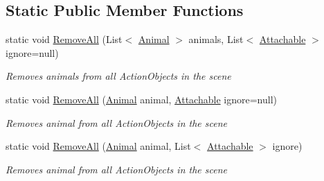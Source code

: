 \subsection*{Static Public Member Functions}
\begin{DoxyCompactItemize}
\item 
static void \mbox{\hyperlink{class_attachable_a63695e26ad1e6e27d3d252451524f18e}{Remove\+All}} (List$<$ \mbox{\hyperlink{class_animal}{Animal}} $>$ animals, List$<$ \mbox{\hyperlink{class_attachable}{Attachable}} $>$ ignore=null)
\begin{DoxyCompactList}\small\item\em Removes {\itshape animals}  from all Action\+Objects in the scene \end{DoxyCompactList}\item 
static void \mbox{\hyperlink{class_attachable_a2431a3ad3f6a1a2a4d697e6cc661d55c}{Remove\+All}} (\mbox{\hyperlink{class_animal}{Animal}} animal, \mbox{\hyperlink{class_attachable}{Attachable}} ignore=null)
\begin{DoxyCompactList}\small\item\em Removes {\itshape animal}  from all Action\+Objects in the scene \end{DoxyCompactList}\item 
static void \mbox{\hyperlink{class_attachable_a3b2ed27cc6ed8d9548b8fc6256a24c19}{Remove\+All}} (\mbox{\hyperlink{class_animal}{Animal}} animal, List$<$ \mbox{\hyperlink{class_attachable}{Attachable}} $>$ ignore)
\begin{DoxyCompactList}\small\item\em Removes {\itshape animal}  from all Action\+Objects in the scene \end{DoxyCompactList}\end{DoxyCompactItemize}
